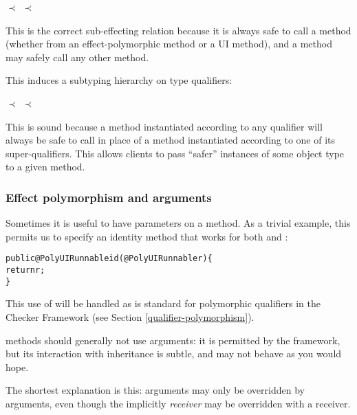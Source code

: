 \centerline{ $\prec$  $\prec$ }

\noindent
This is the correct sub-effecting relation because it is always safe to
call a 
method (whether from an effect-polymorphic method or a UI method), and a  method
may safely call any other method.

This induces a subtyping hierarchy on type qualifiers:

\centerline{ $\prec$  $\prec$ }

\noindent
This is sound because a method instantiated according to any qualifier will always be
safe to call in place of a method instantiated according to one of its super-qualifiers.
This allows clients to pass ``safer'' instances of some object type to a given method.


\subsubsection{Effect polymorphism and arguments\label{guieffect-overrides}}

Sometimes it is useful to have  parameters on a method.  As a trivial example, this
permits us to specify an identity method that works for both  and
:

\begin{alltt}
public @PolyUI Runnable id(@PolyUI Runnable r) \{
    return r;
\}
\end{alltt}

\noindent
This use of  will be handled as is standard for polymorphic qualifiers in the Checker
Framework (see Section \ref{qualifier-polymorphism}).

 methods should generally not use  arguments: it is permitted by
the framework, but its interaction with inheritance is subtle, and may not behave as you would
hope.

The shortest explanation is this:  arguments may only be overridden by 
arguments, even though the implicitly  \emph{receiver} may be overridden with a
 receiver.

